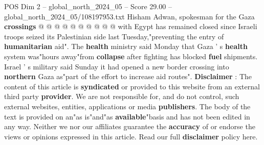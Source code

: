 \begin{textsample}{POS Dim 2 – global\_north\_2024\_05 – Score 29.00 – global\_north\_2024\_05/108197953.txt}
Hisham Adwan, spokesman for the Gaza \textbf{crossings} @ @ @ @ @ @ @ @ @ @ with Egypt has remained closed since Israeli troops seized its Palestinian side last Tuesday,"preventing the entry of \textbf{humanitarian} aid".
The \textbf{health} ministry said Monday that Gaza ' s \textbf{health} system was"hours away"from \textbf{collapse} after fighting has blocked \textbf{fuel} shipments.
Israel ' s military said Sunday it had opened a new border crossing into \textbf{northern} Gaza as"part of the effort to increase aid routes". \textbf{Disclaimer} : The content of this article is \textbf{syndicated} or provided to this website from an external third party \textbf{provider}.
We are not responsible for, and do not control, such external websites, entities, applications or media \textbf{publishers}.
The body of the text is provided on an"as is"and"as \textbf{available}"basis and has not been edited in any way.
Neither we nor our affiliates guarantee the \textbf{accuracy} of or endorse the views or opinions expressed in this article.
Read our full \textbf{disclaimer} policy here.

\end{textsample}
